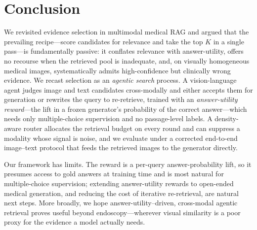 \section{Conclusion}
\label{sec:conclusion}

We revisited evidence selection in multimodal medical RAG and argued that the
prevailing recipe---score candidates for relevance and take the top $K$ in a
single pass---is fundamentally passive: it conflates relevance with
answer-utility, offers no recourse when the retrieved pool is inadequate, and,
on visually homogeneous medical images, systematically admits high-confidence
but clinically wrong evidence. We recast selection as an \emph{agentic search}
process. A vision-language agent judges image and text candidates cross-modally
and either accepts them for generation or rewrites the query to re-retrieve,
trained with an \emph{answer-utility reward}---the lift in a frozen generator's
probability of the correct answer---which needs only multiple-choice supervision
and no passage-level labels. A density-aware router allocates the retrieval
budget on every round and can suppress a modality whose signal is noise, and we
evaluate under a corrected end-to-end image--text protocol that feeds the
retrieved images to the generator directly.

Our framework has limits. The reward is a per-query answer-probability lift, so
it presumes access to gold answers at training time and is most natural for
multiple-choice supervision; extending answer-utility rewards to open-ended
medical generation, and reducing the cost of iterative re-retrieval, are natural
next steps. More broadly, we hope answer-utility--driven, cross-modal agentic
retrieval proves useful beyond endoscopy---wherever visual similarity is a poor
proxy for the evidence a model actually needs.
